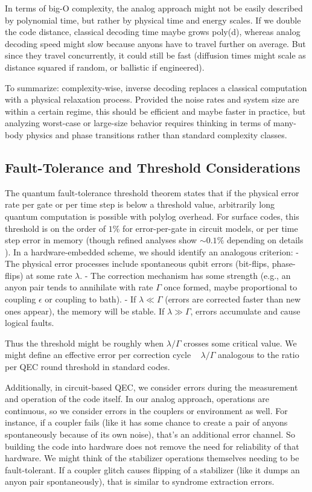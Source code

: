 \documentclass[11pt]{article}
\begin{document}
In terms of big-O complexity, the analog approach might not be easily described by polynomial time, but rather by physical time and energy scales. If we double the code distance, classical decoding time maybe grows poly(d), whereas analog decoding speed might slow because anyons have to travel further on average. But since they travel concurrently, it could still be fast (diffusion times might scale as distance squared if random, or ballistic if engineered).

To summarize: complexity-wise, inverse decoding replaces a classical computation with a physical relaxation process. Provided the noise rates and system size are within a certain regime, this should be efficient and maybe faster in practice, but analyzing worst-case or large-size behavior requires thinking in terms of many-body physics and phase transitions rather than standard complexity classes.

\subsection{Fault-Tolerance and Threshold Considerations}
The quantum fault-tolerance threshold theorem states that if the physical error rate per gate or per time step is below a threshold value, arbitrarily long quantum computation is possible with polylog overhead. For surface codes, this threshold is on the order of $1\%$ for error-per-gate in circuit models, or per time step error in memory (though refined analyses show $\sim0.1\%$ depending on details \cite{Fowler2012}). In a hardware-embedded scheme, we should identify an analogous criterion:
- The physical error processes include spontaneous qubit errors (bit-flips, phase-flips) at some rate $\lambda$.
- The correction mechanism has some strength (e.g., an anyon pair tends to annihilate with rate $\Gamma$ once formed, maybe proportional to coupling $\epsilon$ or coupling to bath).
- If $\lambda \ll \Gamma$ (errors are corrected faster than new ones appear), the memory will be stable. If $\lambda \gg \Gamma$, errors accumulate and cause logical faults.

Thus the threshold might be roughly when $\lambda/\Gamma$ crosses some critical value. We might define an effective error per correction cycle ~ $\lambda / \Gamma$ analogous to the ratio per QEC round threshold in standard codes.

Additionally, in circuit-based QEC, we consider errors during the measurement and operation of the code itself. In our analog approach, operations are continuous, so we consider errors in the couplers or environment as well. For instance, if a coupler fails (like it has some chance to create a pair of anyons spontaneously because of its own noise), that's an additional error channel. So building the code into hardware does not remove the need for reliability of that hardware. We might think of the stabilizer operations themselves needing to be fault-tolerant. If a coupler glitch causes flipping of a stabilizer (like it dumps an anyon pair spontaneously), that is similar to syndrome extraction errors.
\end{document}
